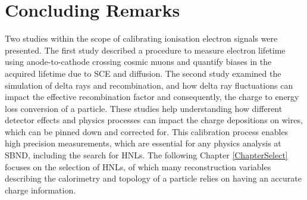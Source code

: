 \section{Concluding Remarks}
\label{sec:concludeDeltaRay}

Two studies within the scope of calibrating ionisation electron signals were presented. 
The first study described a procedure to measure electron lifetime using anode-to-cathode crossing cosmic muons and quantify biases in the acquired lifetime due to SCE and diffusion. 
The second study examined the simulation of delta rays and recombination, and how delta ray fluctuations can impact the effective recombination factor and consequently, the charge to energy loss conversion of a particle.
These studies help understanding how different detector effects and physics processes can impact the charge depositions on wires, which can be pinned down and corrected for.
This calibration process enables high precision measurements, which are essential for any physics analysis at SBND, including the search for HNLs.
The following Chapter \ref{ChapterSelect} focuses on the selection of HNLs, of which many reconstruction variables describing the calorimetry and topology of a particle relies on having an accurate charge information. 

